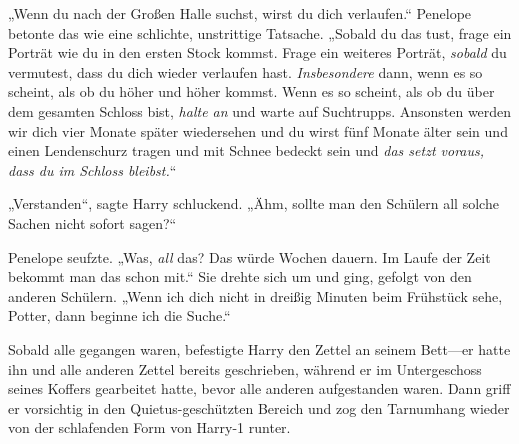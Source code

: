 „Wenn du nach der Großen Halle suchst, wirst du dich verlaufen.“ Penelope betonte das wie eine schlichte, unstrittige Tatsache. „Sobald du das tust, frage ein Porträt wie du in den ersten Stock kommst. Frage ein weiteres Porträt, \emph{sobald} du vermutest, dass du dich wieder verlaufen hast. \emph{Insbesondere} dann, wenn es so scheint, als ob du höher und höher kommst. Wenn es so scheint, als ob du über dem gesamten Schloss bist, \emph{halte an} und warte auf Suchtrupps. Ansonsten werden wir dich vier Monate später wiedersehen und du wirst fünf Monate älter sein und einen Lendenschurz tragen und mit Schnee bedeckt sein und \emph{das setzt voraus, dass du \emph{im} Schloss bleibst.}“

„Verstanden“, sagte Harry schluckend. „Ähm, sollte man den Schülern all solche Sachen nicht sofort sagen?“

Penelope seufzte. „Was, \emph{all} das? Das würde Wochen dauern. Im Laufe der Zeit bekommt man das schon mit.“ Sie drehte sich um und ging, gefolgt von den anderen Schülern. „Wenn ich dich nicht in dreißig Minuten beim Frühstück sehe, Potter, dann beginne ich die Suche.“

Sobald alle gegangen waren, befestigte Harry den Zettel an seinem Bett—er hatte ihn und alle anderen Zettel bereits geschrieben, während er im Untergeschoss seines Koffers gearbeitet hatte, bevor alle anderen aufgestanden waren. Dann griff er vorsichtig in den Quietus-geschützten Bereich und zog den Tarnumhang wieder von der schlafenden Form von Harry-1 runter.

